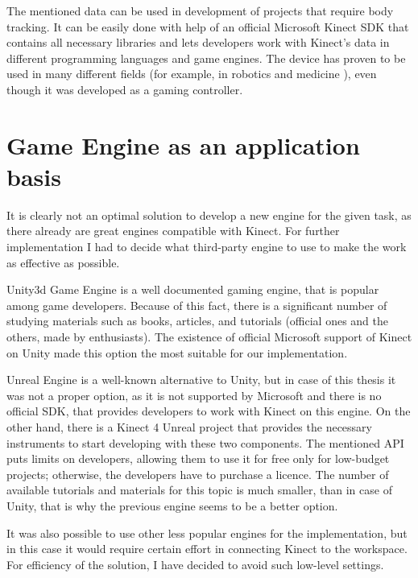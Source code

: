 \documentclass[a4paper]{report}
\begin{document}
 The mentioned data can be used in development of projects that require body tracking. It can be easily done with help of an official Microsoft Kinect SDK that contains all necessary libraries and lets developers work with Kinect’s data in different programming languages and game engines. The device has proven to be used in many different fields (for example, in robotics and medicine \cite{kinectV2VisionSystem}\cite{auMagicMirror}), even though it was developed as a gaming controller.

\section{Game Engine as an application basis}
\label{section_Engine}
 \qquad It is clearly not an optimal solution to develop a new engine for the given task, as there already are great engines compatible with Kinect. For further implementation I had to decide what third-party engine to use to make the work as effective as possible. 
 
\bigskip Unity3d Game Engine \cite{unity3dHome} is a well documented gaming engine, that is popular among game developers. Because of this fact, there is a significant number of studying materials such as books, articles, and tutorials (official ones and the others, made by enthusiasts). The existence of official Microsoft support of Kinect on Unity made this option the most suitable for our implementation. 
 
  Unreal Engine \cite{UnrealEngineHome} is a well-known alternative to Unity, but in case of this thesis it was not a proper option, as it is not supported by Microsoft and there is no official SDK, that provides developers to work with Kinect on this engine. On the other hand, there is a Kinect 4 Unreal project \cite{Kinect4Unreal} that provides the necessary instruments to start developing with these two components. The mentioned API puts limits on developers, allowing them to use it for free only for low-budget projects; otherwise, the developers have to purchase a licence. The number of available tutorials and materials for this topic is much smaller, than in case of Unity, that is why the previous engine seems to be a better option.
 
  It was also possible to use other less popular engines for the implementation, but in this case it would require certain effort in connecting Kinect to the workspace. For efficiency of the solution, I have decided to avoid such low-level settings.
	
\end{document}
